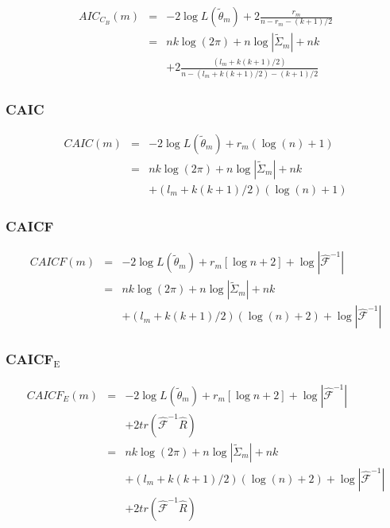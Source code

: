 \begin{eqnarray*}
AIC_{C_{B}}\left(m\right) & = & -2\log L\left(\widetilde{\theta}_{m}\right)+2\frac{r_{m}}{n-r_{m}-(k+1)/2}\\
 & = & nk\log\left(2\pi\right)+n\log\left\vert \widetilde{\Sigma}_{m}\right\vert +nk\\
 &  & +2\frac{\left(l_{m}+k\left(k+1\right)/2\right)}{n-\left(l_{m}+k\left(k+1\right)/2\right)-\left(k+1\right)/2}
\end{eqnarray*}



\subsubsection{CAIC}

\begin{eqnarray*}
CAIC\left(m\right) & = & -2\log L\left(\widetilde{\theta}_{m}\right)+r_{m}\left(\log\left(n\right)+1\right)\\
 & = & nk\log\left(2\pi\right)+n\log\left\vert \widetilde{\Sigma}_{m}\right\vert +nk\\
 &  & +\left(l_{m}+k\left(k+1\right)/2\right)\left(\log\left(n\right)+1\right)
\end{eqnarray*}



\subsubsection{CAICF}

\begin{eqnarray*}
CAICF\left(m\right) & = & -2\log L\left(\widetilde{\theta}_{m}\right)+r_{m}\left[\log n+2\right]+\log\left\vert \hat{\mathcal{F}}^{-1}\right\vert \\
 & = & nk\log\left(2\pi\right)+n\log\left\vert \widetilde{\Sigma}_{m}\right\vert +nk\\
 &  & +\left(l_{m}+k\left(k+1\right)/2\right)\left(\log\left(n\right)+2\right)+\log\left\vert \hat{\mathcal{F}}^{-1}\right\vert 
\end{eqnarray*}



\subsubsection{CAICF$_{\text{E}}$}

\begin{eqnarray*}
CAICF_{E}\left(m\right) & = & -2\log L\left(\widetilde{\theta}_{m}\right)+r_{m}\left[\log n+2\right]+\log\left\vert \hat{\mathcal{F}}^{-1}\right\vert \\
 &  & +2tr\left(\hat{\mathcal{F}}^{-1}\hat{R}\right)\\
 & = & nk\log\left(2\pi\right)+n\log\left\vert \widetilde{\Sigma}_{m}\right\vert +nk\\
 &  & +\left(l_{m}+k\left(k+1\right)/2\right)\left(\log\left(n\right)+2\right)+\log\left\vert \hat{\mathcal{F}}^{-1}\right\vert \\
 &  & +2tr\left(\hat{\mathcal{F}}^{-1}\hat{R}\right)
\end{eqnarray*}



